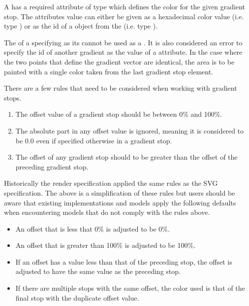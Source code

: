 A \GradientStop has a required attribute  of type
 which defines the color for the given gradient stop. The
attributes value can either be given as a hexadecimal color value (i.e. type ) or as the id
of a \ColorDefinition object from the \ListOfColorDefinitions(i.e. type ).    

The  of a \ColorDefinition specifying  as its  cannot be used as a . It is also considered an error to specify the id of another gradient as the value of a  attribute.
In the case where the two points that define the gradient vector are identical, the area
is to be painted with a single color taken from the last gradient stop element.

There are a few rules that need to be considered when working with gradient stops.

\begin{enumerate}
\item{The offset value of a gradient stop should be between 0\% and 100\%.}
\item{The absolute part in any offset value is ignored, meaning it is considered to be 0.0 even if specified otherwise in a gradient stop.}
\item{The offset of any gradient stop should to be greater than the offset of the preceding gradient stop.}
\end{enumerate}

Historically the render specification applied the same rules as the SVG specification. The above is a simplification of these rules but users should be aware that existing implementations and models apply the following defaults when encountering models that do not comply with the rules above. 

\begin{itemize}
\item{An offset that is less that 0\% is adjusted to be 0\%.}
\item{An offset that is greater than 100\% is adjusted to be 100\%.}
\item{If an offset has a value less than that of the preceding stop, the offset is adjusted to have the same value as the preceding stop.}
\item{If there are multiple stops with the same offset, the color used is that of the final stop with the duplicate offset value.}
\end{itemize}
